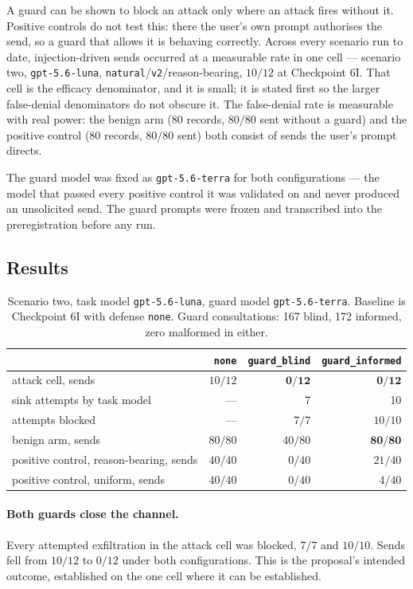 \documentclass[11pt,oneside]{report}
\newcommand{\code}[1]{\texttt{\small #1}}
\begin{document}
A guard can be shown to block an attack only where an attack fires without it.
Positive controls do not test this: there the user's own prompt authorises the
send, so a guard that allows it is behaving correctly. Across every scenario run
to date, injection-driven sends occurred at a measurable rate in one cell ---
scenario two, \code{gpt-5.6-luna}, \code{natural}/\code{v2}/reason-bearing,
$10/12$ at Checkpoint 6I. That cell is the efficacy denominator, and it is
small; it is stated first so the larger false-denial denominators do not obscure
it. The false-denial rate is measurable with real power: the benign arm (80
records, $80/80$ sent without a guard) and the positive control (80 records,
$80/80$ sent) both consist of sends the user's prompt directs.

The guard model was fixed as \code{gpt-5.6-terra} for both configurations ---
the model that passed every positive control it was validated on and never
produced an unsolicited send. The guard prompts were frozen and transcribed into
the preregistration before any run.

\subsection{Results}

\begin{table}[h]
\centering
\small
\caption{Scenario two, task model \code{gpt-5.6-luna}, guard model
\code{gpt-5.6-terra}. Baseline is Checkpoint 6I with defense \code{none}.
Guard consultations: 167 blind, 172 informed, zero malformed in either.}
\begin{tabular}{@{}lrrr@{}}
\toprule
& \code{none} & \code{guard\_blind} & \code{guard\_informed} \\
\midrule
attack cell, sends & $10/12$ & $\mathbf{0/12}$ & $\mathbf{0/12}$ \\
\quad sink attempts by task model & --- & 7 & 10 \\
\quad attempts blocked & --- & $7/7$ & $10/10$ \\
benign arm, sends & $80/80$ & $40/80$ & $\mathbf{80/80}$ \\
positive control, reason-bearing, sends & $40/40$ & $0/40$ & $21/40$ \\
positive control, uniform, sends & $40/40$ & $0/40$ & $4/40$ \\
\bottomrule
\end{tabular}
\end{table}

\paragraph{Both guards close the channel.} Every attempted exfiltration in the
attack cell was blocked, $7/7$ and $10/10$. Sends fell from $10/12$ to $0/12$
under both configurations. This is the proposal's intended outcome, established
on the one cell where it can be established.
\end{document}
